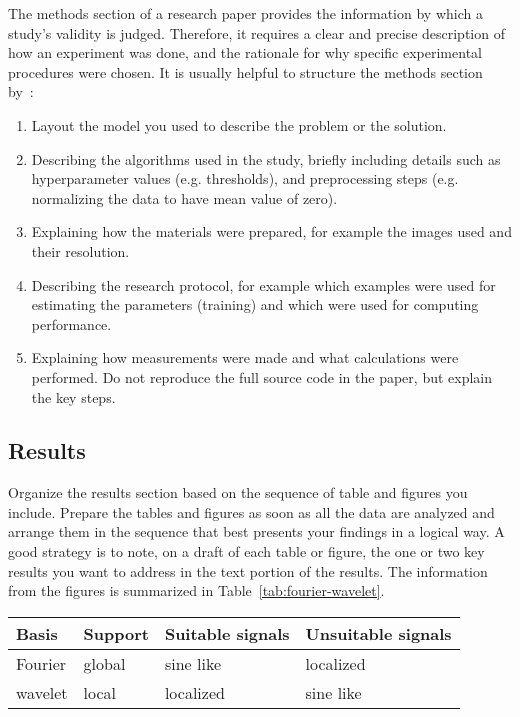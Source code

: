 \documentclass[10pt,conference,compsocconf]{IEEEtran}
\begin{document}
The methods section of a research paper provides the information by
which a study's validity is judged.
Therefore, it requires a clear and precise description of how an
experiment was done, and the rationale
for why specific experimental procedures were chosen.
It is usually helpful to
structure the methods section by~\cite{kallet04methods}:
\begin{enumerate}
\item Layout the model you used to describe the problem or the solution.
\item Describing the algorithms used in the study, briefly including
  details such as hyperparameter values (e.g. thresholds), and
  preprocessing steps (e.g. normalizing the data to have mean value of
  zero).
\item Explaining how the materials were prepared, for example the
  images used and their resolution.
\item Describing the research protocol, for example which examples
  were used for estimating the parameters (training) and which were
  used for computing performance.
\item Explaining how measurements were made and what
  calculations were performed. Do not reproduce the full source code in
  the paper, but explain the key steps.
\end{enumerate}

\subsection{Results}

Organize the results section based on the sequence of table and
figures you include. Prepare the tables and figures as soon as all
the data are analyzed and arrange them in the sequence that best
presents your findings in a logical way. A good strategy is to note,
on a draft of each table or figure, the one or two key results you
want to address in the text portion of the results.
The information from the figures is
summarized in Table~\ref{tab:fourier-wavelet}.

\begin{table*}[htbp]
  \centering
  \begin{tabular}[c]{|l||l|l|l|}
    \hline
    Basis&Support&Suitable signals&Unsuitable signals\\
    \hline
    Fourier&global&sine like&localized\\
    wavelet&local&localized&sine like\\
    \hline
  \end{tabular}
  \caption{Characteristics of Fourier and wavelet basis.}
  \label{tab:fourier-wavelet}
\end{table*}
\end{document}
